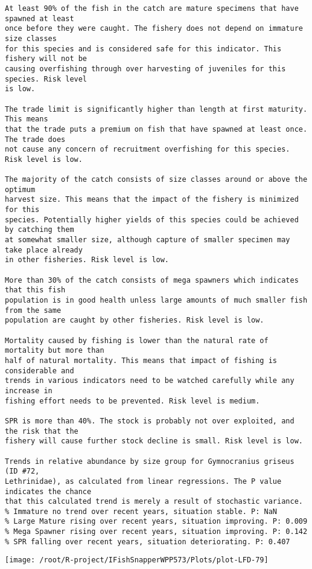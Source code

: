 \documentclass{report}\usepackage[]{graphicx}\usepackage[]{color}
\makeatletter
\def\maxwidth{ %
  \ifdim\Gin@nat@width>\linewidth
    \linewidth
  \else
    \Gin@nat@width
  \fi
}
\newenvironment{kframe}{%
 \def\at@end@of@kframe{}%
 \ifinner\ifhmode%
  \def\at@end@of@kframe{\end{minipage}}%
  \begin{minipage}{\columnwidth}%
 \fi\fi%
 \def\FrameCommand##1{\hskip\@totalleftmargin \hskip-\fboxsep
 \colorbox{shadecolor}{##1}\hskip-\fboxsep
     \hskip-\linewidth \hskip-\@totalleftmargin \hskip\columnwidth}%
 \MakeFramed {\advance\hsize-\width
   \@totalleftmargin\z@ \linewidth\hsize
   \@setminipage}}%
 {\par\unskip\endMakeFramed%
 \at@end@of@kframe}
\newenvironment{knitrout}{}{} %
\makeatother
\begin{document}
\begin{knitrout}
\begin{kframe}
\begin{verbatim}
At least 90% of the fish in the catch are mature specimens that have spawned at least
once before they were caught. The fishery does not depend on immature size classes
for this species and is considered safe for this indicator. This fishery will not be
causing overfishing through over harvesting of juveniles for this species. Risk level
is low.

The trade limit is significantly higher than length at first maturity.  This means
that the trade puts a premium on fish that have spawned at least once. The trade does
not cause any concern of recruitment overfishing for this species. Risk level is low.

The majority of the catch consists of size classes around or above the optimum
harvest size. This means that the impact of the fishery is minimized for this
species. Potentially higher yields of this species could be achieved by catching them
at somewhat smaller size, although capture of smaller specimen may take place already
in other fisheries. Risk level is low.

More than 30% of the catch consists of mega spawners which indicates that this fish
population is in good health unless large amounts of much smaller fish from the same
population are caught by other fisheries. Risk level is low.
 
Mortality caused by fishing is lower than the natural rate of mortality but more than
half of natural mortality. This means that impact of fishing is considerable and
trends in various indicators need to be watched carefully while any increase in
fishing effort needs to be prevented. Risk level is medium.
 
SPR is more than 40%. The stock is probably not over exploited, and the risk that the
fishery will cause further stock decline is small. Risk level is low.
 
Trends in relative abundance by size group for Gymnocranius griseus (ID #72,
Lethrinidae), as calculated from linear regressions. The P value indicates the chance
that this calculated trend is merely a result of stochastic variance.
% Immature no trend over recent years, situation stable. P: NaN
% Large Mature rising over recent years, situation improving. P: 0.009
% Mega Spawner rising over recent years, situation improving. P: 0.142
% SPR falling over recent years, situation deteriorating. P: 0.407
\end{verbatim}
\end{kframe}
\texttt{[image: /root/R-project/IFishSnapperWPP573/Plots/plot-LFD-79]} 


\end{knitrout}
\end{document}
